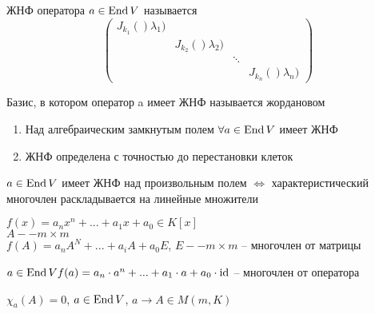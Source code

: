 \begin{Def} 
	ЖНФ оператора $a \in \operatorname{End} V$ называется $$\left(\begin{array}{cccc}
		J_{k_1}()\lambda_1) &  &  & \\
		 & J_{k_2}()\lambda_2) &  &\\
		 & & \ddots &\\
		 & & & J_{k_n}()\lambda_n)
	\end{array}\right)$$
\end{Def} 

\begin{Def} 
	Базис, в котором оператор a имеет ЖНФ называется жордановом
\end{Def} 

\begin{Thm}[ЖНФ] 
	\begin{enumerate}
		\item Над алгебраическим замкнутым полем $\forall a \in \operatorname{End} V$ имеет ЖНФ
		\item ЖНФ определена с точностью до перестановки клеток
	\end{enumerate}
\end{Thm} 

\begin{Thm} 
	$a \in \operatorname{End} V$ имеет ЖНФ над произвольным полем $\Leftrightarrow$ характеристический многочлен раскладывается на линейные множители
\end{Thm} 


\begin{Def} 
	$f(x) = a_nx^n+...+a_1x+a_0 \in K[x]$\\
	$A -- m\times m$\\
	$f(A) = a_nA^N+...+a_iA+a_0E$, $E -- m \times m$ -- многочлен от матрицы
\end{Def} 

\begin{Def} 
	$a \in \operatorname{End} V\\
	f(a) = a_n \cdot a^n + ... + a_1 \cdot a + a_0 \cdot \operatorname{id}$ -- многочлен от оператора
\end{Def} 

\begin{Thm} 
	$\chi_a(A)=0$, $a \in \operatorname{End} V$, $a \to A \in M(m, K)$
\end{Thm} 

